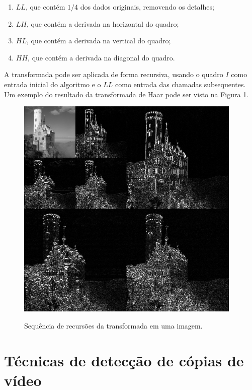 \begin{enumerate}
\item $LL$, que contém $1/4$ dos dados originais, removendo os detalhes;
\item $LH$, que contém a derivada na horizontal do quadro;
\item $HL$, que contém a derivada na vertical do quadro;
\item $HH$, que contém a derivada na diagonal do quadro.
\end{enumerate}

A transformada pode ser aplicada de forma recursiva, usando o quadro $I$ como entrada inicial do algoritmo e o $LL$ como entrada das chamadas subsequentes. Um exemplo do resultado da transformada de Haar pode ser visto na Figura \ref{fig:transf_haar}.

 \begin{figure}[h]
      \centering
      \caption{Sequência de recursões da transformada em uma imagem.}
      \includegraphics[width=0.96\textwidth]{dados/figuras/haar.png}      
      \label{fig:transf_haar}
    \end{figure}  

\section{Técnicas de detecção de cópias de vídeo} 
     
